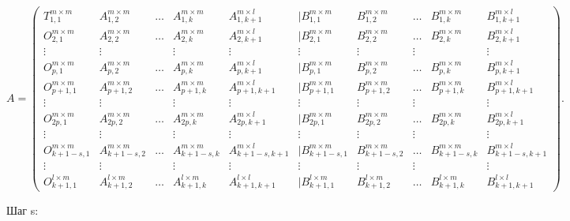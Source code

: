 \documentclass[a4paper,12pt]{article}
\begin{document}
\begin{equation*}
A = 
\begin{pmatrix}
T_{1,1}^{m \times m} & A_{1,2}^{m \times m} & \dots & A_{1,k}^{m \times m} & A_{1,k+1}^{m \times l} & | B_{1,1}^{m \times m} & B_{1,2}^{m \times m} & \dots & B_{1,k}^{m\times m} & B_{1,k+1}^{m \times l}\\
O_{2,1}^{m \times m} & A_{2,2}^{m \times m} & \dots & A_{2,k}^{m \times m} & A_{2,k+1}^{m \times l} & | B_{2,1}^{m \times m} & B_{2,2}^{m \times m} & \dots & B_{2,k}^{m\times m} & B_{2,k+1}^{m \times l}\\
\vdots & \vdots &  & \vdots & \vdots &\vdots  &\vdots   &\vdots  & \  &\vdots \\
O_{p,1}^{m \times m} & A_{p,2}^{m \times m} & \dots & A_{p,k}^{m \times m} & A_{p,k+1}^{m \times l}& | B_{p,1}^{m \times m} & B_{p,2}^{m \times m} & \dots & B_{p,k}^{m\times m} & B_{p,k+1}^{m \times l}\\
\hline
O_{p+1,1}^{m \times m} & A_{p+1,2}^{m \times m} & \dots & A_{p+1,k}^{m \times m} & A_{p+1,k+1}^{m \times l} & | B_{p+1,1}^{m \times m} & B_{p+1,2}^{m \times m} & \dots & B_{p+1,k}^{m\times m} & B_{p+1,k+1}^{m \times l}\\
\vdots & \vdots &  & \vdots & \vdots &\vdots  &\vdots   &\vdots  & \  &\vdots \\O_{2p,1}^{m \times m} & A_{2p,2}^{m \times m} & \dots & A_{2p,k}^{m \times m} & A_{2p,k+1}^{m \times l} & | B_{2p,1}^{m \times m} & B_{2p,2}^{m \times m} & \dots & B_{2p,k}^{m\times m} & B_{2p,k+1}^{m \times l}\\
\hline
\vdots & \vdots &  & \vdots & \vdots &\vdots  &\vdots   &\vdots  & \  &\vdots \\\hline
O_{k+1-s,1}^{m \times m} & A_{k+1-s,2}^{m \times m} & \dots & A_{k+1-s,k}^{m \times m} & A_{k+1-s,k+1}^{m \times l} & | B_{k+1-s,1}^{m \times m} & B_{k+1-s,2}^{m \times m} & \dots & B_{k+1-s,k}^{m\times m} & B_{k+1-s,k+1}^{m \times l}\\
\vdots & \vdots &  & \vdots & \vdots &\vdots  &\vdots   &\vdots  & \  &\vdots \\
O_{k+1,1}^{l \times m} & A_{k+1,2}^{l \times m} & \dots & A_{k+1,k}^{l \times m} & A_{k+1,k+1}^{l \times l} & | B_{k+1,1}^{l \times m} & B_{k+1,2}^{l \times m} & \dots & B_{k+1,k}^{l\times m} & B_{k+1,k+1}^{l \times l}
\end{pmatrix}.
\end{equation*}

{\fontsize{14}{14}\selectfont Шаг s:}\\
\end{document}
